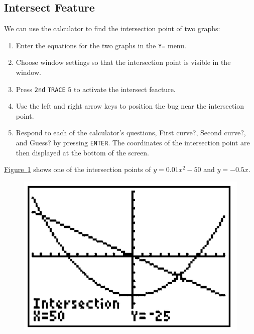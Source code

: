 \documentclass[10pt,]{book}
\theoremstyle{plain}
\theoremstyle{definition}
\theoremstyle{definition}
\theoremstyle{definition}
\numberwithin{equation}{part}
\begin{document}
\subsection[{Intersect Feature}]{Intersect Feature}\label{subsection-80}
We can use the calculator to find the intersection point of two graphs: \leavevmode%
\begin{enumerate}[label=*\arabic**]
\item\hypertarget{li-417}{}Enter the equations for the two graphs in the \lstinline?Y=? menu.%
\item\hypertarget{li-418}{}Choose window settings so that the intersection point is visible in the window.%
\item\hypertarget{li-419}{}Press \lstinline?2nd? \lstinline?TRACE? \(5\) to activate the intersect feacture.%
\item\hypertarget{li-420}{}Use the left and right arrow keys to position the bug near the intersection point.%
\item\hypertarget{li-421}{}Respond to each of the calculator’s questions, First curve?, Second curve?, and Guess? by pressing \lstinline?ENTER?. The coordinates of the intersection point are then displayed at the bottom of the screen.%
\end{enumerate}
 \hyperref[fig-GC-intersect]{Figure~\ref{fig-GC-intersect}} shows one of the intersection points of \(y = 0.01x^2 − 50\) and \(y = −0.5x\). \leavevmode%
\begin{figure}
\centering
\includegraphics[width=0.4\linewidth]{images/fig-GC-intersect.jpg}
\caption{\label{fig-GC-intersect}}
\end{figure}
%
\typeout{************************************************}
\typeout{************************************************}
\end{document}
